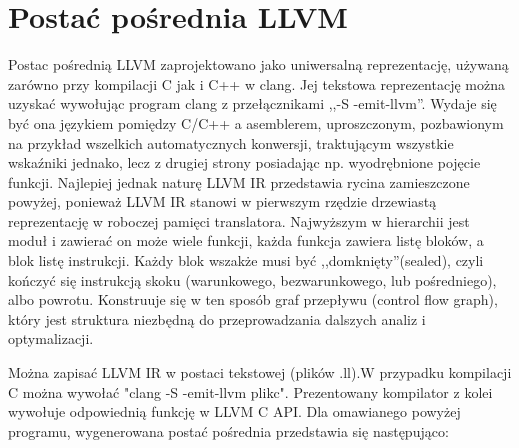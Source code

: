 \section{Postać pośrednia LLVM}
Postac pośrednią LLVM zaprojektowano jako uniwersalną reprezentację, używaną zarówno przy kompilacji C jak i C++ w clang. Jej tekstowa reprezentację można uzyskać wywołując program clang z przełącznikami ,,-S -emit-llvm''. Wydaje się być ona językiem pomiędzy C/C++ a asemblerem, uproszczonym, pozbawionym na przykład wszelkich automatycznych konwersji, traktującym wszystkie wskaźniki jednako, lecz z drugiej strony posiadając np. wyodrębnione pojęcie funkcji. Najlepiej jednak naturę LLVM IR przedstawia rycina zamieszczone powyżej, ponieważ LLVM IR stanowi w pierwszym rzędzie drzewiastą reprezentację w roboczej pamięci translatora.
Najwyższym w hierarchii jest moduł i zawierać on może wiele funkcji, każda funkcja zawiera listę bloków, a blok listę instrukcji. Każdy blok wszakże musi być ,,domknięty''(sealed), czyli kończyć się instrukcją skoku (warunkowego, bezwarunkowego, lub pośredniego), albo powrotu. Konstruuje się w ten sposób graf przepływu (control flow graph), który jest struktura niezbędną do przeprowadzania dalszych analiz i optymalizacji.

Można zapisać LLVM IR w postaci tekstowej (plików .ll).W przypadku kompilacji C można wywołać "clang -S -emit-llvm plikc". Prezentowany kompilator z kolei wywołuje odpowiednią funkcję w LLVM C API. Dla omawianego powyżej programu, wygenerowana postać pośrednia przedstawia się następująco:

